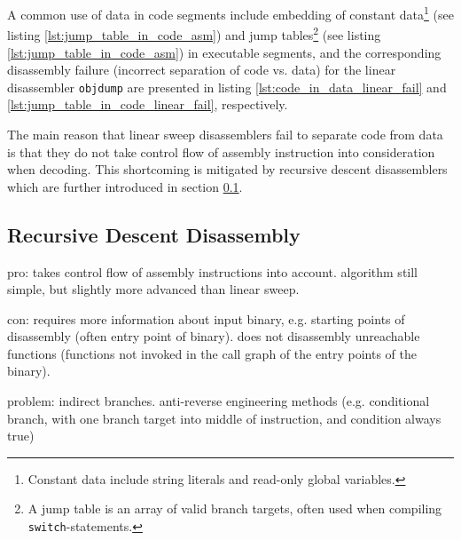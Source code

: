 A common use of data in code segments include embedding of constant data\footnote{Constant data include string literals and read-only global variables.} (see listing \ref{lst:jump_table_in_code_asm}) and jump tables\footnote{A jump table is an array of valid branch targets, often used when compiling \texttt{switch}-statements.} (see listing \ref{lst:jump_table_in_code_asm}) in executable segments, and the corresponding disassembly failure (incorrect separation of code vs. data) for the linear disassembler \texttt{objdump} are presented in listing \ref{lst:code_in_data_linear_fail} and \ref{lst:jump_table_in_code_linear_fail}, respectively.

The main reason that linear sweep disassemblers fail to separate code from data is that they do not take control flow of assembly instruction into consideration when decoding. This shortcoming is mitigated by recursive descent disassemblers which are further introduced in section \ref{sec:recursive_descent_disassembly}.





\subsection{Recursive Descent Disassembly}
\label{sec:recursive_descent_disassembly}


pro: takes control flow of assembly instructions into account. algorithm still simple, but slightly more advanced than linear sweep.

con: requires more information about input binary, e.g. starting points of disassembly (often entry point of binary). does not disassembly unreachable functions (functions not invoked in the call graph of the entry points of the binary).

problem: indirect branches. anti-reverse engineering methods (e.g. conditional branch, with one branch target into middle of instruction, and condition always true)


